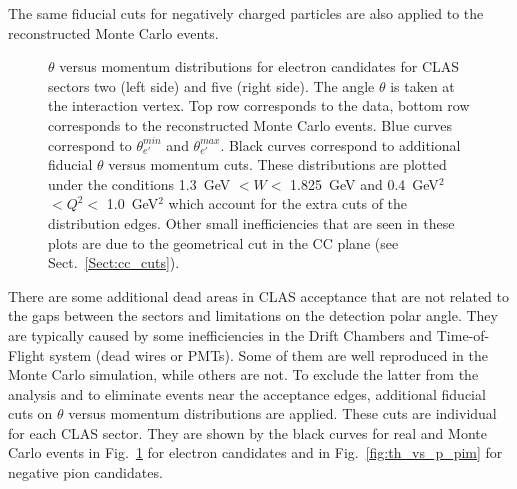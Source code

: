 The same fiducial cuts for negatively charged particles are also applied to the reconstructed Monte Carlo events.

\begin{figure}[htp]
\begin{center}
\caption{\small  $\theta$ versus momentum distributions for electron candidates for CLAS sectors two (left side) and five (right side). The angle $\theta$ is taken at the interaction vertex. Top row corresponds to the data, bottom row corresponds to the reconstructed Monte Carlo events. Blue curves correspond to $\theta_{e'}^{min}$ and $\theta_{e'}^{max}$. Black curves correspond to additional fiducial $\theta$ versus momentum cuts. These distributions are plotted under the conditions 1.3~GeV $< W <$ 1.825~GeV and 0.4~GeV$^{2}$ $< Q^{2} <$ 1.0~GeV$^{2}$ which account for the extra cuts of the distribution edges. Other small inefficiencies that are seen in these plots are due to the geometrical cut in the CC plane (see Sect.~\ref{Sect:cc_cuts}). \label{fig:th_vs_p_el}}
\end{center}
\end{figure}

There are some additional dead areas in CLAS acceptance that are not related to the gaps between the sectors and limitations on the detection polar angle. They are typically caused by some inefficiencies in the Drift Chambers and Time-of-Flight system (dead wires or PMTs). Some of them are well reproduced in the Monte Carlo simulation, while others are not. To exclude the latter from the analysis and to eliminate events near the acceptance edges, additional fiducial cuts on $\theta$ versus momentum distributions are applied. These cuts are individual for each CLAS sector. They are shown by the black curves for real and Monte Carlo events in Fig.~\ref{fig:th_vs_p_el} for electron candidates and in Fig.~\ref{fig:th_vs_p_pim} for negative pion candidates. 

